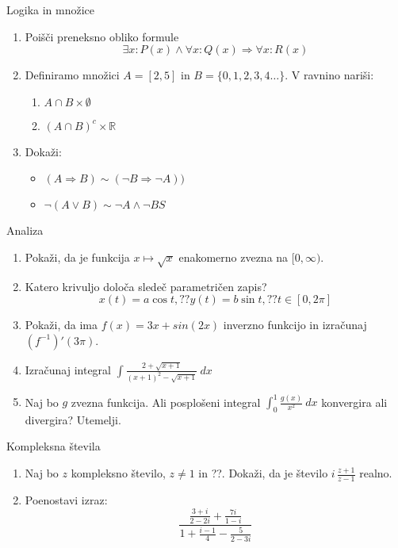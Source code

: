 \begin{frame}{Logika in množice}
	\begin{enumerate}
		\item
		Poišči preneksno obliko formule 
		$$\exists x : P(x) \wedge \forall x : Q(x) \Rightarrow \forall x : R(x)$$
		\item 
		Definiramo množici $A=[2,5]$ in $B=\{0,1,2,3,4\ldots\}$.
		V ravnino nariši:
		\begin{enumerate}
		   \item $A\cap B \times \emptyset$
		   \item $(A\cap B)^c \times \mathbb{R}$
		\end{enumerate}
		\item
		Dokaži:
		\begin{itemize}
			\item $(A\Rightarrow B)\sim(\neg B\Rightarrow \neg A))$
			\item $\neg(A \vee B)\sim \neg A \wedge \neg BS$
		\end{itemize}
	\end{enumerate}
\end{frame}

\begin{frame}{Analiza}
	\begin{enumerate}
		\item
		Pokaži, da je funkcija $x\mapsto \sqrt{x}$ enakomerno zvezna na $[0,\infty)$.
		\item 
		Katero krivuljo določa sledeč parametričen zapis?
		$$
		   x(t) = a \cos t, ?? %
		   y(t) = b \sin t, ?? %
		   t \in [0, 2 \pi]
		$$ 
		\item
		Pokaži, da ima $f(x)=3x + sin(2x)$ inverzno funkcijo 
		in izračunaj $(f^{-1})'(3\pi)$.
		
		\item
		Izračunaj integral 
		$\displaystyle \int\frac{2+\sqrt{x+1}}{(x+1)^2-\sqrt{x+1}} \ dx$
		\item 
		Naj bo $g$ zvezna funkcija. Ali posplošeni integral 
		$\int_{0}^{1}\frac{g(x)}{x^2} \ dx$
		konvergira ali divergira? Utemelji.
	\end{enumerate}
\end{frame}

\begin{frame}{Kompleksna števila}
	\begin{enumerate}
		\item
		Naj bo $z$ kompleksno število, $z \ne 1$ in ??.
		Dokaži, da je število \( i \, \frac{z+1}{z-1} \) realno.
		\item
		Poenostavi izraz:
		\[\displaystyle \frac{\frac{3+i}{2-2i}+\frac{7i}{1-i}}{1+\frac{i-1}{4}-\frac{5}{2-3i}}\]
	\end{enumerate}
\end{frame}